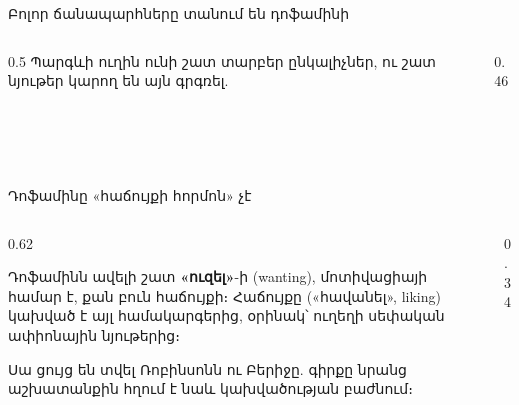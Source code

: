 \begin{frame}{Բոլոր ճանապարհները տանում են դոֆամինի}
  \begin{columns}[c]
    \begin{column}{0.5\textwidth}
      {\small Պարգևի ուղին ունի շատ տարբեր ընկալիչներ, ու շատ նյութեր կարող են այն գրգռել.}\par\smallskip
      \ \ \par\smallskip
      \ \par\medskip
    \end{column}
    \begin{column}{0.46\textwidth}
    \end{column}
  \end{columns}
\end{frame}

\begin{frame}{Դոֆամինը «հաճույքի հորմոն» չէ}
  \begin{columns}[c]
    \begin{column}{0.62\textwidth}
      \begin{scienceupdate}
        Դոֆամինն ավելի շատ \textbf{«ուզել»}-ի (wanting), մոտիվացիայի համար է, քան բուն հաճույքի։ Հաճույքը («հավանել», liking) կախված է այլ համակարգերից, օրինակ՝ ուղեղի սեփական ափիոնային նյութերից։\par\smallskip
        Սա ցույց են տվել Ռոբինսոնն ու Բերիջը. գիրքը նրանց աշխատանքին հղում է նաև կախվածության բաժնում։
      \end{scienceupdate}
    \end{column}
    \begin{column}{0.34\textwidth}
    \end{column}
  \end{columns}
\end{frame}

